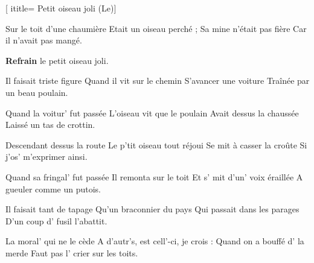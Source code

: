  [
ititle= {Petit oiseau joli (Le)}]

\beginverse
Sur le toit d'une chaumière
Etait un oiseau perché ;
Sa mine n'était pas fière
Car il n'avait pas mangé.
\endverse

\beginchorus
\textbf {Refrain}
 le petit oiseau joli.
\endchorus

\beginverse
Il faisait triste figure
Quand il vit sur le chemin
S'avancer une voiture
Traînée par un beau poulain.
\endverse

\beginverse
Quand la voitur' fut passée
L'oiseau vit que le poulain
Avait dessus la chaussée
Laissé un tas de crottin.
\endverse

\beginverse
Descendant dessus la route
Le p'tit oiseau tout réjoui
Se mit à casser la croûte
Si j'os' m'exprimer ainsi.
\endverse

\beginverse
Quand sa fringal' fut passée
Il remonta sur le toit
Et s' mit d'un' voix éraillée
A gueuler comme un putois.
\endverse

\beginverse
Il faisait tant de tapage
Qu'un braconnier du pays
Qui passait dans les parages
D'un coup d' fusil l'abattit.
\endverse

\beginverse
La moral' qui ne le cède
A d'autr's, est cell'-ci, je crois :
Quand on a bouffé d' la merde
Faut pas l' crier sur les toits.
\endverse

\endsong
